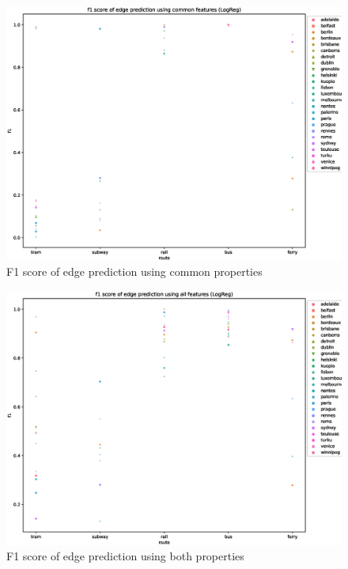 \documentclass{article}
\theoremstyle{plain}
\theoremstyle{definition}
\theoremstyle{remark}
\begin{document}
\begin{figure}[ht]
\vskip -0.1in
\begin{center}
\centerline{\includegraphics[width=\columnwidth]{images/edge-pred-commono.eps}}
\caption{F1 score of edge prediction using common properties}
\label{edge-pred-common_fig}
\end{center}
\vskip -0.3in
\end{figure}

\begin{figure}[ht]
\vskip -0.1in
\begin{center}
\centerline{\includegraphics[width=\columnwidth]{images/edge-pred-all.eps}}
\caption{F1 score of edge prediction using both properties}
\label{edge-pred-all_fig}
\end{center}
\vskip -0.3in
\end{figure}
\end{document}
